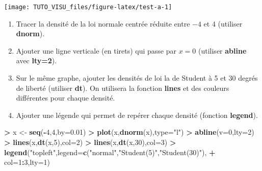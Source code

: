 \documentclass[]{book}
\newenvironment{Shaded}{\begin{snugshade}}{\end{snugshade}}
\newcommand{\DataTypeTok}[1]{\textcolor[rgb]{0.13,0.29,0.53}{#1}}
\newcommand{\DecValTok}[1]{\textcolor[rgb]{0.00,0.00,0.81}{#1}}
\newcommand{\FloatTok}[1]{\textcolor[rgb]{0.00,0.00,0.81}{#1}}
\newcommand{\KeywordTok}[1]{\textcolor[rgb]{0.13,0.29,0.53}{\textbf{#1}}}
\newcommand{\NormalTok}[1]{#1}
\newcommand{\OperatorTok}[1]{\textcolor[rgb]{0.81,0.36,0.00}{\textbf{#1}}}
\newcommand{\StringTok}[1]{\textcolor[rgb]{0.31,0.60,0.02}{#1}}
\providecommand{\tightlist}{%
  \setlength{\itemsep}{0pt}\setlength{\parskip}{0pt}}
\theoremstyle{definition}
\theoremstyle{definition}
\theoremstyle{definition}
\theoremstyle{remark}
\let\BeginKnitrBlock\begin \let\EndKnitrBlock\end
\begin{document}
\begin{center}\texttt{[image: TUTO\_VISU\_files/figure-latex/test-a-1]} \end{center}

\BeginKnitrBlock{exercise}[Tracé de densités]
\protect\hypertarget{exr:exo2}{}{\label{exr:exo2} \iffalse (Tracé de densités) \fi{} }
\EndKnitrBlock{exercise}

\begin{enumerate}
\def\labelenumi{\arabic{enumi}.}
\tightlist
\item
  Tracer la densité de la loi normale centrée réduite entre \(-4\) et 4 (utiliser \textbf{dnorm}).
\item
  Ajouter une ligne verticale (en tirets) qui passe par \(x=0\) (utiliser \textbf{abline} avec \textbf{lty=2}).
\item
  Sur le même graphe, ajouter les densités de loi la de Student à 5 et 30 degrés de liberté (utiliser \textbf{dt}). On utilisera la fonction \textbf{lines} et des couleurs différentes pour chaque densité.
\item
  Ajouter une légende qui permet de repérer chaque densité (fonction \textbf{legend}).
\end{enumerate}

\begin{Shaded}
\begin{Highlighting}[]
\OperatorTok{>}\StringTok{ }\NormalTok{x <-}\StringTok{ }\KeywordTok{seq}\NormalTok{(}\OperatorTok{-}\DecValTok{4}\NormalTok{,}\DecValTok{4}\NormalTok{,}\DataTypeTok{by=}\FloatTok{0.01}\NormalTok{)}
\OperatorTok{>}\StringTok{ }\KeywordTok{plot}\NormalTok{(x,}\KeywordTok{dnorm}\NormalTok{(x),}\DataTypeTok{type=}\StringTok{"l"}\NormalTok{)}
\OperatorTok{>}\StringTok{ }\KeywordTok{abline}\NormalTok{(}\DataTypeTok{v=}\DecValTok{0}\NormalTok{,}\DataTypeTok{lty=}\DecValTok{2}\NormalTok{)}
\OperatorTok{>}\StringTok{ }\KeywordTok{lines}\NormalTok{(x,}\KeywordTok{dt}\NormalTok{(x,}\DecValTok{5}\NormalTok{),}\DataTypeTok{col=}\DecValTok{2}\NormalTok{)}
\OperatorTok{>}\StringTok{ }\KeywordTok{lines}\NormalTok{(x,}\KeywordTok{dt}\NormalTok{(x,}\DecValTok{30}\NormalTok{),}\DataTypeTok{col=}\DecValTok{3}\NormalTok{)}
\OperatorTok{>}\StringTok{ }\KeywordTok{legend}\NormalTok{(}\StringTok{"topleft"}\NormalTok{,}\DataTypeTok{legend=}\KeywordTok{c}\NormalTok{(}\StringTok{"normal"}\NormalTok{,}\StringTok{"Student(5)"}\NormalTok{,}\StringTok{"Student(30)"}\NormalTok{),}
\OperatorTok{+}\StringTok{        }\DataTypeTok{col=}\DecValTok{1}\OperatorTok{:}\DecValTok{3}\NormalTok{,}\DataTypeTok{lty=}\DecValTok{1}\NormalTok{)}
\end{Highlighting}
\end{Shaded}
\end{document}

